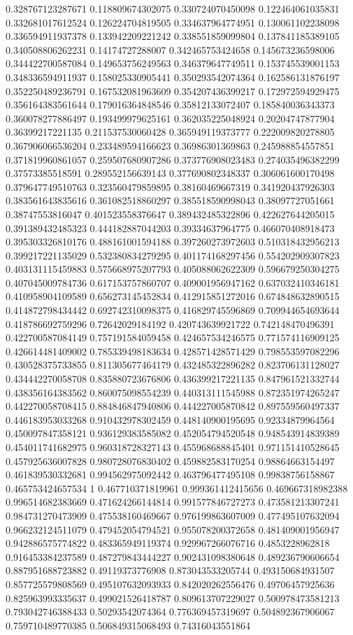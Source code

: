 \begin{table}
\begin{tabu}
\begin{sparkline}{10}
0.328767123287671 0.118809674302075 0.330724070450098 0.122464061035831 0.332681017612524 0.126224704819505 0.334637964774951 0.130061102238098 0.336594911937378 0.133942209221242 0.338551859099804 0.137841185389105 0.340508806262231 0.14174727288007 0.342465753424658 0.145673236598006 0.344422700587084 0.149653756249563 0.346379647749511 0.153745539001153 0.348336594911937 0.158025330905441 0.350293542074364 0.162586131876197 0.352250489236791 0.167532081963609 0.354207436399217 0.172972594929475 0.356164383561644 0.179016364848546 0.35812133072407 0.185840036343373 0.360078277886497 0.193499979625161 0.362035225048924 0.20204747877904 0.36399217221135 0.211537530060428 0.365949119373777 0.222009820278805 0.367906066536204 0.233489594166623 0.36986301369863 0.245988854557851 0.371819960861057 0.259507680907286 0.373776908023483 0.274035496382299 0.37573385518591 0.289552156639143 0.377690802348337 0.306061600170498 0.379647749510763 0.323560479859895 0.38160469667319 0.341920437926303 0.383561643835616 0.361082518860297 0.385518590998043 0.38097727051661 0.38747553816047 0.401523558376647 0.389432485322896 0.422627644205015 0.391389432485323 0.444182887044203 0.39334637964775 0.466070408918473 0.395303326810176 0.488161001594188 0.397260273972603 0.510318432956213 0.399217221135029 0.532380834279295 0.401174168297456 0.554202909307823 0.403131115459883 0.575668975207793 0.405088062622309 0.596679250304275 0.407045009784736 0.617153757860707 0.409001956947162 0.637032410346181 0.410958904109589 0.656273145452834 0.412915851272016 0.674848632890515 0.414872798434442 0.692742310098375 0.416829745596869 0.709944654693644 0.418786692759296 0.72642029184192 0.420743639921722 0.742148470496391 0.422700587084149 0.757191584059458 0.424657534246575 0.771574116909125 0.426614481409002 0.785339498183634 0.428571428571429 0.798553597082296 0.430528375733855 0.811305677464179 0.432485322896282 0.823706131128027 0.434442270058708 0.835880723676806 0.436399217221135 0.847961521332744 0.438356164383562 0.860075098554239 0.440313111545988 0.872351974265247 0.442270058708415 0.884846847940806 0.444227005870842 0.897559560497337 0.446183953033268 0.910432978302459 0.448140900195695 0.92334879964564 0.450097847358121 0.936129383585082 0.452054794520548 0.948543914839389 0.454011741682975 0.960318728327143 0.455968688845401 0.971151410528645 0.457925636007828 0.980728076830402 0.459882583170254 0.98864663154497 0.461839530332681 0.994562975092442 0.463796477495108 0.99838756158867 0.465753424657534 1 0.467710371819961 0.999361412415656 0.469667318982388 0.996514682383669 0.471624266144814 0.991577846727273 0.473581213307241 0.984731270473909 0.475538160469667 0.976199863607009 0.477495107632094 0.966232124511079 0.479452054794521 0.955078200372658 0.481409001956947 0.942886575774822 0.483365949119374 0.929967266076716 0.4853228962818 0.916453384237589 0.487279843444227 0.902431098380648 0.489236790606654 0.887951688723882 0.49119373776908 0.873043533205744 0.493150684931507 0.857725579808569 0.495107632093933 0.842020262556476 0.49706457925636 0.825963993335637 0.499021526418787 0.809613707229027 0.500978473581213 0.793042746388433 0.50293542074364 0.776369457319697 0.504892367906067 0.759710489770385 0.506849315068493 0.74316043551864 
\end{sparkline}
\end{tabu}
\end{table}
